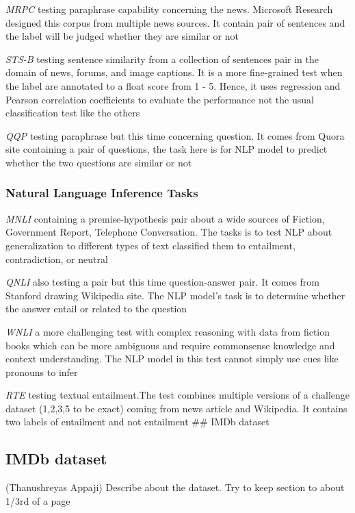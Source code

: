 \documentclass[
  11pt,
]{article}
\begin{document}
\emph{MRPC} testing paraphrase capability concerning the news. Microsoft
Research designed this corpus from multiple news sources. It contain
pair of sentences and the label will be judged whether they are similar
or not

\emph{STS-B} testing sentence similarity from a collection of sentences
pair in the domain of news, forums, and image captions. It is a more
fine-grained test when the label are annotated to a float score from 1 -
5. Hence, it uses regression and Pearson correlation coefficients to
evaluate the performance not the usual classification test like the
others

\emph{QQP} testing paraphrase but this time concerning question. It
comes from Quora site containing a pair of questions, the task here is
for NLP model to predict whether the two questions are similar or not

\subsubsection{Natural Language Inference
Tasks}\label{natural-language-inference-tasks}

\emph{MNLI} containing a premise-hypothesis pair about a wide sources of
Fiction, Government Report, Telephone Conversation. The tasks is to test
NLP about generalization to different types of text classified them to
entailment, contradiction, or neutral

\emph{QNLI} also testing a pair but this time question-answer pair. It
comes from Stanford drawing Wikipedia site. The NLP model's task is to
determine whether the answer entail or related to the question

\emph{WNLI} a more challenging test with complex reasoning with data
from fiction books which can be more ambiguous and require commonsense
knowledge and context understanding. The NLP model in this test cannot
simply use cues like pronouns to infer

\emph{RTE} testing textual entailment.The test combines multiple
versions of a challenge dataset (1,2,3,5 to be exact) coming from news
article and Wikipedia. It contains two labels of entailment and not
entailment \#\# IMDb dataset

\subsection{IMDb dataset}\label{imdb-dataset}

(Thanushreyas Appaji) Describe about the dataset. Try to keep section to
about 1/3rd of a page
\end{document}
